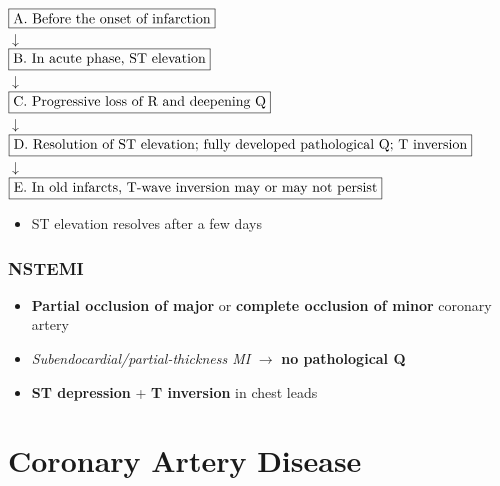 \documentclass[
  12pt,
]{memoir}
\providecommand{\tightlist}{%
  \setlength{\itemsep}{0pt}\setlength{\parskip}{0pt}}
\begin{document}
\begin{center}
$\fbox{A. Before the onset of infarction}$\\
$\downarrow$\\
$\fbox{B. In acute phase, ST elevation}$\\
$\downarrow$\\
$\fbox{C. Progressive loss of R and deepening Q}$\\
$\downarrow$\\
$\fbox{D. Resolution of ST elevation; fully developed pathological Q;
T inversion}$\\
$\downarrow$\\
$\fbox{E. In old infarcts, T-wave inversion may or may not persist}$\\
\end{center}

\begin{itemize}
\tightlist
\item
  ST elevation resolves after a few days
\end{itemize}

\hypertarget{nstemi}{%
\subsubsection{NSTEMI}\label{nstemi}}

\begin{itemize}
\tightlist
\item
  \textbf{Partial occlusion of major} or \textbf{complete occlusion of
  minor} coronary artery
\item
  \emph{Subendocardial/partial-thickness MI} \(\rightarrow\) \textbf{no
  pathological Q}
\item
  \textbf{ST depression} + \textbf{T inversion} in chest leads
\end{itemize}

\hypertarget{coronary-artery-disease}{%
\section{Coronary Artery Disease}\label{coronary-artery-disease}}
\end{document}
